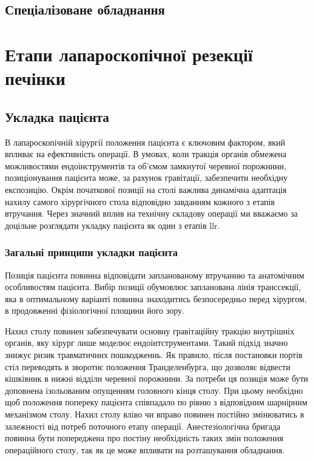 \begin{refsection}
\subsection{Спеціалізоване обладнання}


\section{Етапи лапароскопічної резекції печінки}

\subsection{Укладка пацієнта}

В лапароскопічній хірургії положення пацієнта є ключовим фактором, який впливає на ефективність операції. В умовах, коли тракція органів обмежена можливостями ендоінструментів та об'ємом замкнутої черевної порожнини, позиціонування пацієнта може, за рахунок гравітації, забезпечити необхідну експозицію. Окрім початкової позиції на столі важлива динамічна адаптація нахилу самого хірургічного стола відповідно завданням кожного з етапів втручання. Через значний вплив на технічну складову операції ми вважаємо за доцільне розглядати укладку пацієнта як один з етапів \acrshort{llr}.

\subsubsection{Загальні принципи укладки пацієнта}

Позиція пацієнта повинна відповідати запланованому втручанню та анатомічним особливостям пацієнта. Вибір позиції обумовлює запланована лінія транссекції, яка в оптимальному варіанті повинна знаходитись безпосередньо перед хірургом, в продовженні фізіологічної площини його зору. 

Нахил столу повинен забезпечувати основну гравітаційну тракцію внутрішніх органів, яку хірург лише моделює ендоінтструментами. Такий підхід значно знижує ризик травматичних пошкодженнь. Як правило, після постановки портів стіл переводять в зворотнє положення Транделенбурга, що дозволяє відвести кішківник в нижні відділи черевної порожнини. За потреби ця позиція може бути доповнена ізольованим опущенням головного кінця столу. При цьому необхідно щоб положення попереку пацієнта співпадало по рівню з відповідним шарнірним механізмом столу. Нахил столу вліво чи вправо повинен постійно змінюватись в залежності від потреб поточного етапу операції. 
Анестезіологічна бригада повинна бути попереджена про постіну необхідність таких змін положення операційного столу, так як це може впливати на розташування обладнання. 


\end{refsection}
